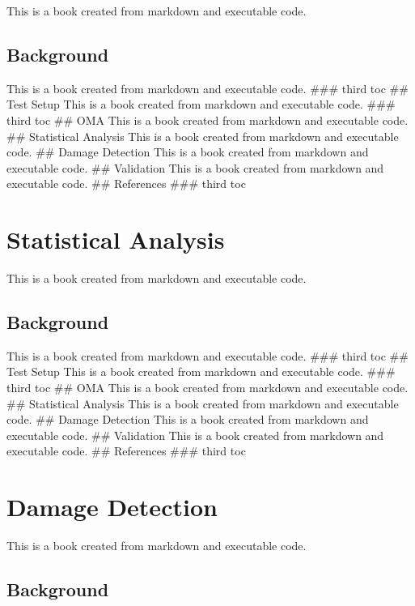 \documentclass[
  letterpaper,
  DIV=11,
  numbers=noendperiod]{scrreprt}
\begin{document}
This is a book created from markdown and executable code.

\hypertarget{background-18}{%
\section{Background}\label{background-18}}

This is a book created from markdown and executable code. \#\#\# third
toc \#\# Test Setup This is a book created from markdown and executable
code. \#\#\# third toc \#\# OMA This is a book created from markdown and
executable code. \#\# Statistical Analysis This is a book created from
markdown and executable code. \#\# Damage Detection This is a book
created from markdown and executable code. \#\# Validation This is a
book created from markdown and executable code. \#\# References \#\#\#
third toc

\hypertarget{statistical-analysis}{%
\chapter{Statistical Analysis}\label{statistical-analysis}}

This is a book created from markdown and executable code.

\hypertarget{background-19}{%
\section{Background}\label{background-19}}

This is a book created from markdown and executable code. \#\#\# third
toc \#\# Test Setup This is a book created from markdown and executable
code. \#\#\# third toc \#\# OMA This is a book created from markdown and
executable code. \#\# Statistical Analysis This is a book created from
markdown and executable code. \#\# Damage Detection This is a book
created from markdown and executable code. \#\# Validation This is a
book created from markdown and executable code. \#\# References \#\#\#
third toc

\hypertarget{damage-detection}{%
\chapter{Damage Detection}\label{damage-detection}}

This is a book created from markdown and executable code.

\hypertarget{background-20}{%
\section{Background}\label{background-20}}
\end{document}

